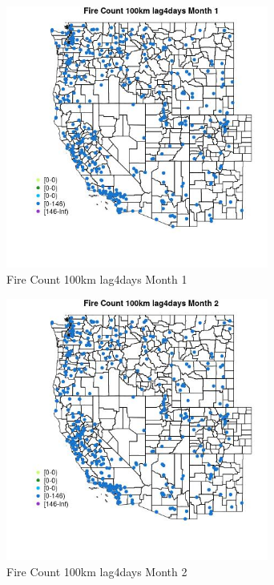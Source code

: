 \begin{figure} 
\centering  
\includegraphics[width=0.77\textwidth]{Code_Outputs/Report_ML_input_PM25_Step4_part_e_de_duplicated_aves_compiled_2019-05-18wNAs_MapObsMo1Fire_Count_100km_lag4days.jpg} 
\caption{\label{fig:Report_ML_input_PM25_Step4_part_e_de_duplicated_aves_compiled_2019-05-18wNAsMapObsMo1Fire_Count_100km_lag4days}Fire Count 100km lag4days Month 1} 
\end{figure} 
 

\begin{figure} 
\centering  
\includegraphics[width=0.77\textwidth]{Code_Outputs/Report_ML_input_PM25_Step4_part_e_de_duplicated_aves_compiled_2019-05-18wNAs_MapObsMo2Fire_Count_100km_lag4days.jpg} 
\caption{\label{fig:Report_ML_input_PM25_Step4_part_e_de_duplicated_aves_compiled_2019-05-18wNAsMapObsMo2Fire_Count_100km_lag4days}Fire Count 100km lag4days Month 2} 
\end{figure} 
 

